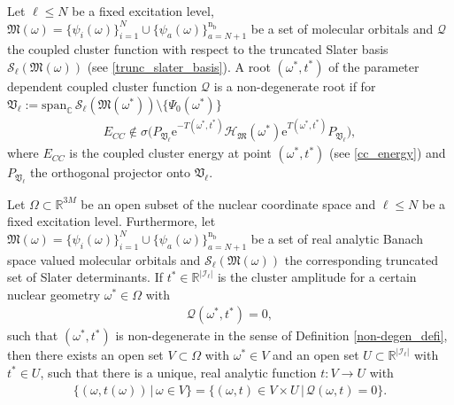\documentclass[10pt,a4paper]{amsart}
\begin{document}
\begin{definition}\label{non-degen_defi} Let $\ell\le N$ be a fixed excitation level, $\mathfrak{M}(\omega)= \lbrace \psi_i(\omega)\rbrace_{i=1}^N\cup \lbrace \psi_a(\omega)\rbrace_{a=N+1}^{\mathrm{n}_\mathrm{b}}$ be a set of molecular orbitals and $\mathcal{Q}$ the coupled cluster function with respect to the truncated Slater basis $\mathcal{S}_\ell(\mathfrak{M}(\omega))$ (see \eqref{trunc_slater_basis}). 
    A root $(\omega^*, t^*)$ of the parameter dependent coupled cluster function $\mathcal{Q}$ is a non-degenerate root if for $\mathfrak{V}_\ell:=\mathrm{span}_{\mathbb{C}}\,\mathcal{S}_\ell(\mathfrak{M}(\omega^*))\setminus  \lbrace \Psi_0(\omega^*) \rbrace$ 
    \begin{align}\label{non-degen-assum}
        E_{CC} \notin \sigma\big(P_{\mathfrak{V}_\ell}\mathrm{e}^{-T(\omega^*,t^*)}\mathcal{H}_{\mathfrak{M}}(\omega^*)\mathrm{e}^{T(\omega^*,t^*)}P_{\mathfrak{V}_\ell}\big),
    \end{align}
  where $E_{CC}$ is the coupled cluster energy at point $(\omega^*,t^*)$ (see \eqref{cc_energy}) and $P_{\mathfrak{V}_\ell}$ the orthogonal projector onto $\mathfrak{V}_\ell$.
\end{definition}

\begin{theorem}\label{analytic_amplitudes}

    Let $\Omega\subset \mathbb{R}^{3M}$ be an open subset of the nuclear coordinate space and $\ell\le N$ be a fixed excitation level. Furthermore, let  $\mathfrak{M}(\omega)= \lbrace \psi_i(\omega)\rbrace_{i=1}^N\cup \lbrace \psi_a(\omega)\rbrace_{a=N+1}^{\mathrm{n}_\mathrm{b}}$ be a set of real analytic Banach space valued molecular orbitals and $\mathcal{S}_\ell(\mathfrak{M}(\omega))$ the corresponding truncated set of Slater determinants. If $t^* \in \mathbb{R}^{|\mathscr{I}_\ell|}$ is the cluster amplitude for a certain nuclear geometry $\omega^*\in \Omega $ with 
    \begin{align}
        \mathcal{Q}(\omega^*,t^*)=0,
    \end{align}
    such that $(\omega^*,t^*)$ is non-degenerate in the sense of Definition  \ref{non-degen_defi}, then there exists an open set $V\subset \Omega$ with $\omega^* \in V$ and an open set $U \subset \mathbb{R}^{|\mathscr{I}_\ell|}$ with $t^*\in U$, such that there is a unique, real analytic function $t:V\longrightarrow U$ with 
    \begin{align}
        \big\lbrace (\omega,t(\omega)) \,|\,  \omega\in V\big\rbrace=\big\lbrace  (\omega,t)\in V\times U \,|\,  \mathcal{Q}(\omega,t)=0\big\rbrace.
    \end{align}
\end{theorem}
\end{document}
